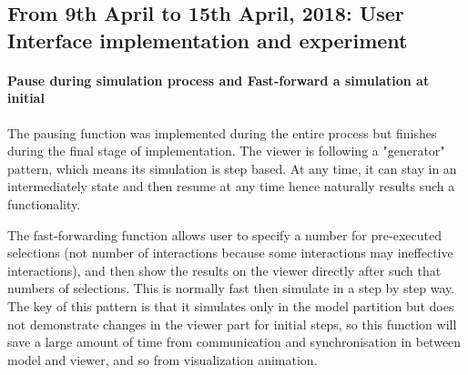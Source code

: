 \subsection{From 9th April to 15th April, 2018: User Interface implementation and experiment}
\paragraph{Pause during simulation process and Fast-forward a simulation at initial}
The pausing function was implemented during the entire process but finishes during the final stage of implementation.
The viewer is following a "generator" pattern, which means its simulation is step based. At any time, it can stay in an intermediately
state and then resume at any time hence naturally results such a functionality.
\par\noindent
The fast-forwarding function allows user to specify a number for pre-executed selections (not number of interactions because some interactions may ineffective interactions),
and then show the results on the viewer directly after such that numbers of selections. This is normally fast then simulate in a step by step way. The key of this pattern is that
it simulates only in the model partition but does not demonstrate changes in the viewer part for initial steps, so this function will save a large amount of time from communication and synchronisation in between
model and viewer, and so from visualization animation.
